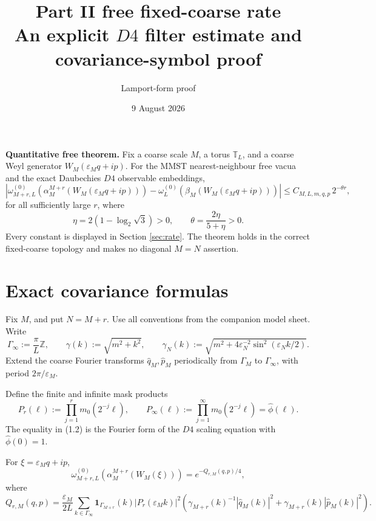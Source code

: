 \documentclass[11pt,a4paper]{article}
\title{Part II free fixed-coarse rate\\[3pt]
\large An explicit \(D4\) filter estimate and covariance-symbol proof}
\author{Lamport-form proof}
\date{9 August 2026}
\newcommand{\eps}{\varepsilon}
\newcommand{\T}{\mathbb T}
\begin{document}
\maketitle

\begin{resultbox}
\textbf{Quantitative free theorem.}  Fix a coarse scale \(M\), a torus
\(\T_L\), and a coarse Weyl generator \(W_M(\eps_Mq+ip)\).  For the MMST
nearest-neighbour free vacua and the exact Daubechies \(D4\) observable
embeddings,
\[
 \left|
 \omega_{M+r,L}^{(0)}\!\left(\alpha_M^{M+r}
      (W_M(\eps_Mq+ip))\right)
 -\omega_L^{(0)}\!\left(\beta_M(W_M(\eps_Mq+ip))\right)
 \right|
 \le C_{M,L,m,q,p}\,2^{-\theta r},                              \tag{R}
\]
for all sufficiently large \(r\), where
\[
 \eta=2(1-\log_2\sqrt3)>0,\qquad
 \theta=\frac{2\eta}{5+\eta}>0.                                \tag{E}
\]
Every constant is displayed in Section \ref{sec:rate}.  The theorem holds in
the correct fixed-coarse topology and makes no diagonal \(M=N\) assertion.
\end{resultbox}

\tableofcontents

\section{Exact covariance formulas}\label{sec:cov}

Fix \(M\), and put \(N=M+r\).  Use all conventions from the companion model
sheet.  Write
\[
 \Gamma_\infty:=\frac{\pi}{L}\mathbb Z,\qquad
 \gamma(k):=\sqrt{m^2+k^2},\qquad
 \gamma_N(k):=\sqrt{m^2+4\eps_N^{-2}\sin^2(\eps_Nk/2)}.          \tag{1.1}
\]
Extend the coarse Fourier transforms \(\widehat q_M,\widehat p_M\) periodically
from \(\Gamma_M\) to \(\Gamma_\infty\), with period \(2\pi/\eps_M\).

Define the finite and infinite mask products
\[
 P_r(\ell):=\prod_{j=1}^r m_0(2^{-j}\ell),\qquad
 P_\infty(\ell):=\prod_{j=1}^\infty m_0(2^{-j}\ell)
 =\widehat\phi(\ell).                                          \tag{1.2}
\]
The equality in (1.2) is the Fourier form of the \(D4\) scaling equation with
\(\widehat\phi(0)=1\).

\begin{lemma}\label{lem:finecov}
For \(\xi=\eps_Mq+ip\),
\[
 \omega_{M+r,L}^{(0)}(\alpha_M^{M+r}(W_M(\xi)))
 =e^{-Q_{r,M}(q,p)/4},                                        \tag{1.3}
\]
where
\[
 Q_{r,M}(q,p)
 =\frac{\eps_M}{2L}\sum_{k\in\Gamma_\infty}
 \mathbf1_{\Gamma_{M+r}}(k)|P_r(\eps_Mk)|^2
 \left(\gamma_{M+r}(k)^{-1}|\widehat q_M(k)|^2
       +\gamma_{M+r}(k)|\widehat p_M(k)|^2\right).             \tag{1.4}
\]
\end{lemma}
\end{document}
